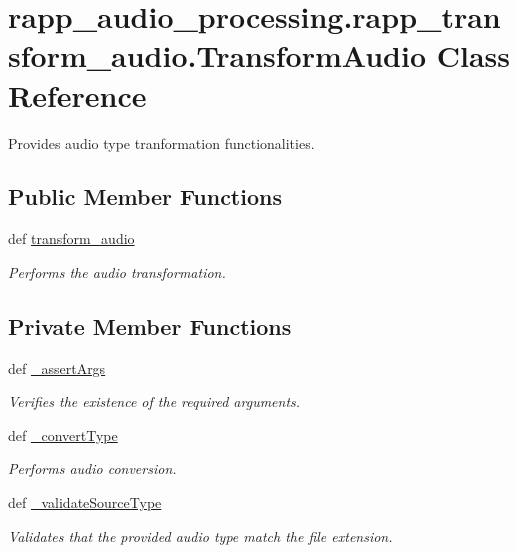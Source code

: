 \hypertarget{classrapp__audio__processing_1_1rapp__transform__audio_1_1TransformAudio}{\section{rapp\-\_\-audio\-\_\-processing.\-rapp\-\_\-transform\-\_\-audio.\-Transform\-Audio Class Reference}
\label{classrapp__audio__processing_1_1rapp__transform__audio_1_1TransformAudio}
}


Provides audio type tranformation functionalities.  


\subsection*{Public Member Functions}
\begin{DoxyCompactItemize}
\item 
def \hyperlink{classrapp__audio__processing_1_1rapp__transform__audio_1_1TransformAudio_a4dc5ecce2d759a99d90165271722c1de}{transform\-\_\-audio}
\begin{DoxyCompactList}\small\item\em Performs the audio transformation. \end{DoxyCompactList}\end{DoxyCompactItemize}
\subsection*{Private Member Functions}
\begin{DoxyCompactItemize}
\item 
def \hyperlink{classrapp__audio__processing_1_1rapp__transform__audio_1_1TransformAudio_a7d5703d4fec062a204d394f4763ff282}{\-\_\-assert\-Args}
\begin{DoxyCompactList}\small\item\em Verifies the existence of the required arguments. \end{DoxyCompactList}\item 
def \hyperlink{classrapp__audio__processing_1_1rapp__transform__audio_1_1TransformAudio_a56ffdcb444c59a8d6f3d45d1cc9dd9ae}{\-\_\-convert\-Type}
\begin{DoxyCompactList}\small\item\em Performs audio conversion. \end{DoxyCompactList}\item 
def \hyperlink{classrapp__audio__processing_1_1rapp__transform__audio_1_1TransformAudio_aa711c617158d0b0b1b2d94bc189830a3}{\-\_\-validate\-Source\-Type}
\begin{DoxyCompactList}\small\item\em Validates that the provided audio type match the file extension. \end{DoxyCompactList}\end{DoxyCompactItemize}


